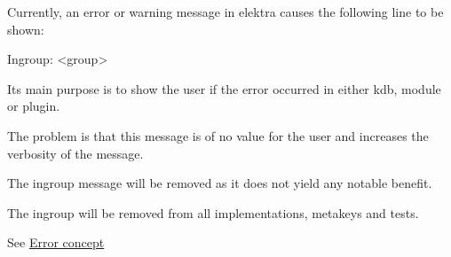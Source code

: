 Currently, an error or warning message in elektra causes the following line to be shown\+:


\begin{DoxyCode}
Ingroup: <group>
\end{DoxyCode}


Its main purpose is to show the user if the error occurred in either {\ttfamily kdb}, {\ttfamily module} or {\ttfamily plugin}.

The problem is that this message is of no value for the user and increases the verbosity of the message.

The {\ttfamily ingroup} message will be removed as it does not yield any notable benefit.

The {\ttfamily ingroup} will be removed from all implementations, metakeys and tests.

See \hyperlink{doc_decisions_error_codes_md}{Error concept}